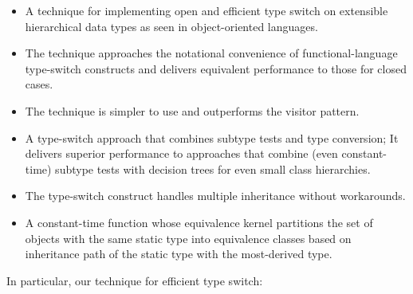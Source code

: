   \begin{itemize}
  \setlength{\itemsep}{0pt}
  \setlength{\parskip}{0pt}
  \item A technique for implementing open and efficient type 
        switch on extensible hierarchical data types as seen in 
        object-oriented languages.
  \item The technique approaches the notational convenience of
	functional-language type-switch constructs and delivers equivalent
 	performance to those for closed cases.
  \item The technique is simpler to use and outperforms the visitor pattern.
  \item A type-switch approach that combines subtype tests and type conversion;
      It delivers superior performance to
        approaches that combine (even constant-time) subtype tests with 
decision trees for even small class hierarchies.
  \item The type-switch construct handles multiple inheritance without workarounds.
  \item A constant-time function whose equivalence kernel partitions 
        the set of objects with the same static type into equivalence classes 
        based on inheritance path of the static type with the most-derived type.
  \end{itemize}

\noindent
In particular, our technique for efficient type switch:

